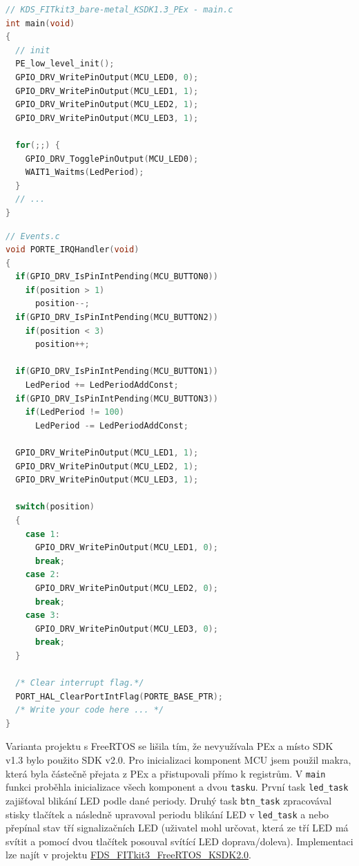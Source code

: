 \documentclass[a4paper]{article}
\begin{document}
\begin{lstlisting}[language=c]
// KDS_FITkit3_bare-metal_KSDK1.3_PEx - main.c
int main(void)
{
  // init
  PE_low_level_init();
  GPIO_DRV_WritePinOutput(MCU_LED0, 0);
  GPIO_DRV_WritePinOutput(MCU_LED1, 1);
  GPIO_DRV_WritePinOutput(MCU_LED2, 1);
  GPIO_DRV_WritePinOutput(MCU_LED3, 1); 
 
  for(;;) {
    GPIO_DRV_TogglePinOutput(MCU_LED0);
    WAIT1_Waitms(LedPeriod);
  }
  // ... 
}
\end{lstlisting}

\newpage

\begin{lstlisting}[language=c]
// Events.c
void PORTE_IRQHandler(void)
{
  if(GPIO_DRV_IsPinIntPending(MCU_BUTTON0))
    if(position > 1)
      position--;
  if(GPIO_DRV_IsPinIntPending(MCU_BUTTON2))
    if(position < 3)
      position++;

  if(GPIO_DRV_IsPinIntPending(MCU_BUTTON1))
    LedPeriod += LedPeriodAddConst;
  if(GPIO_DRV_IsPinIntPending(MCU_BUTTON3))
    if(LedPeriod != 100)
      LedPeriod -= LedPeriodAddConst;

  GPIO_DRV_WritePinOutput(MCU_LED1, 1);
  GPIO_DRV_WritePinOutput(MCU_LED2, 1);
  GPIO_DRV_WritePinOutput(MCU_LED3, 1);

  switch(position)
  {
    case 1:
      GPIO_DRV_WritePinOutput(MCU_LED1, 0);
      break;
    case 2:
      GPIO_DRV_WritePinOutput(MCU_LED2, 0);
      break;
    case 3:
      GPIO_DRV_WritePinOutput(MCU_LED3, 0);
      break;
  }

  /* Clear interrupt flag.*/
  PORT_HAL_ClearPortIntFlag(PORTE_BASE_PTR);
  /* Write your code here ... */
}  
\end{lstlisting}

Varianta projektu s FreeRTOS se lišila tím, že nevyužívala PEx a místo SDK v1.3 bylo použito SDK v2.0. Pro inicializaci komponent MCU jsem použil makra, která byla částečně přejata z PEx a přistupovali přímo k registrům. V  \verb|main| funkci proběhla inicializace všech komponent a dvou \verb|tasku|. První task \verb|led_task| zajišťoval blikání LED podle dané periody. Druhý task \verb|btn_task| zpracovával stisky tlačítek a následně upravoval periodu blikání LED v \verb|led_task| a nebo přepínal stav tří signalizačních LED (uživatel mohl určovat, která ze tří LED má svítit a pomocí dvou tlačítek posouval svítící LED doprava/doleva). Implementaci lze najít v projektu \href{https://github.com/JarekParal/IMP-project/tree/master/projects/FDS_FITkit3_FreeRTOS_KSDK2.0}{FDS\_FITkit3\_FreeRTOS\_KSDK2.0}.
\end{document}
